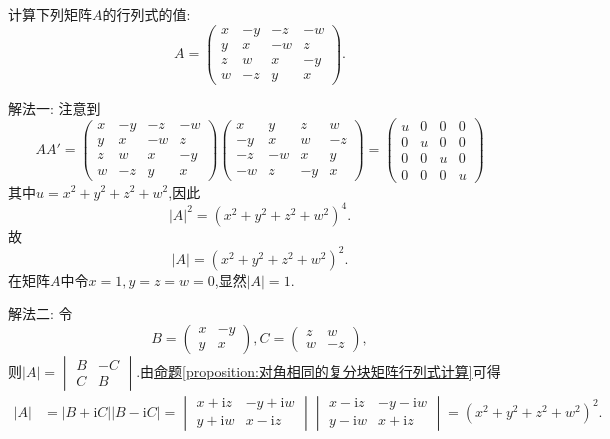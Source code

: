 \documentclass[lang=cn,newtx,10pt,scheme=chinese]{elegantbook}
\begin{document}
\begin{example}
计算下列矩阵\(A\)的行列式的值:
\[
A = 
\begin{pmatrix}
x & -y & -z & -w\\
y & x & -w & z\\
z & w & x & -y\\
w & -z & y & x
\end{pmatrix}.
\]
\end{example}
\begin{solution}
{\color{blue}解法一:}
注意到
\[
AA' = 
\begin{pmatrix}
x & -y & -z & -w\\
y & x & -w & z\\
z & w & x & -y\\
w & -z & y & x
\end{pmatrix}
\begin{pmatrix}
x & y & z & w\\
-y & x & w & -z\\
-z & -w & x & y\\
-w & z & -y & x
\end{pmatrix}
=
\begin{pmatrix}
u & 0 & 0 & 0\\
0 & u & 0 & 0\\
0 & 0 & u & 0\\
0 & 0 & 0 & u
\end{pmatrix}
\]
其中\(u = x^2 + y^2 + z^2 + w^2\),因此
\[
|A|^2=(x^2 + y^2 + z^2 + w^2)^4.
\]
故
\[
|A|=(x^2 + y^2 + z^2 + w^2)^2.
\]
在矩阵\(A\)中令\(x = 1,y = z = w = 0\),显然\(|A| = 1\).

{\color{blue}解法二:}
令
\[
B = 
\begin{pmatrix}
x & -y\\
y & x
\end{pmatrix},
C = 
\begin{pmatrix}
z & w\\
w & -z
\end{pmatrix},
\]
则\(|A| = 
\begin{vmatrix}
B & -C\\
C & B
\end{vmatrix}\).由\hyperref[proposition:对角相同的复分块矩阵行列式计算]{命题\ref{proposition:对角相同的复分块矩阵行列式计算}}可得
\begin{align*}
|A|&=|B + \mathrm{i}C||B - \mathrm{i}C|
=\begin{vmatrix}
x + \mathrm{i}z & -y + \mathrm{i}w\\
y + \mathrm{i}w & x - \mathrm{i}z
\end{vmatrix}\begin{vmatrix}
x - \mathrm{i}z & -y - \mathrm{i}w\\
y - \mathrm{i}w & x + \mathrm{i}z
\end{vmatrix}
=(x^2 + y^2 + z^2 + w^2)^2.
\end{align*}
\end{solution}
\end{document}

